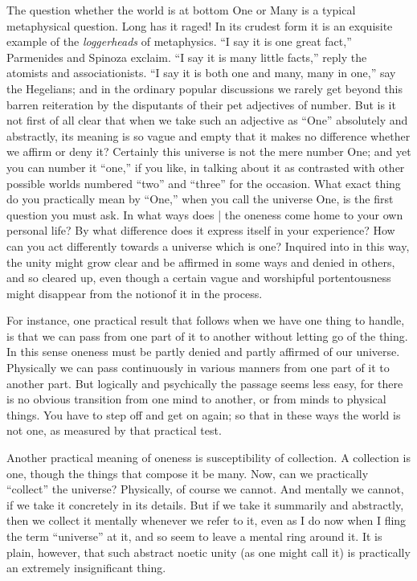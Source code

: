 \documentclass[12pt]{article}
\begin{document}
The question whether the world is at bottom One or Many is a typical metaphysical question. Long has it raged! In its crudest form it is an exquisite example of the \emph{loggerheads} of metaphysics. ``I say it is one great  fact,'' Parmenides and Spinoza exclaim. ``I say it is many little facts,'' reply the atomists and associationists. ``I say it is both one and many, many in one,'' say the Hegelians; and in the ordinary popular discussions we rarely get beyond this barren reiteration by the disputants of their pet adjectives of number. But is it not first of all clear that when we take such an adjective as ``One'' absolutely and abstractly, its meaning is so vague and empty that it makes no difference whether we affirm or deny it? Certainly this universe is not the mere number One; and yet you can number it ``one,'' if you like, in talking about it as contrasted with other possible worlds numbered ``two'' and ``three'' for the occasion. What exact thing do you practically mean by ``One,'' when you call the universe One, is the first question you must ask. In what ways does | the oneness come home to your own personal life? By what difference does it express itself in your experience? How can you act differently towards a universe which is one? Inquired into in this way, the unity might grow clear and be affirmed in some ways and denied in others, and so cleared up, even though a certain vague and worshipful portentousness might disappear from the notionof it in the process. 

For instance, one practical result that follows when we have one thing to handle, is that we can pass from one part of it to another without letting go of the thing. In this sense oneness must be partly denied and partly affirmed of our universe. Physically we can pass continuously in various manners from one part of it to another part. But logically and psychically the passage seems less easy, for there is no obvious transition from one mind to another, or from minds to physical things. You have to step off and get on again; so that in these ways the world is not one, as measured by that practical test. 

Another practical meaning of oneness is susceptibility of collection. A collection is one, though the things that compose it be many. Now, can we practically ``collect'' the universe? Physically, of course we cannot. And mentally we cannot, if we take it concretely in its details. But if we take it summarily and abstractly, then we collect it mentally whenever we refer to it, even as I do now when I fling the term ``universe'' at it, and so seem to leave a mental ring around it. It is plain, however, that such abstract noetic unity (as one might call it) is practically an extremely insignificant thing. 
\end{document}
